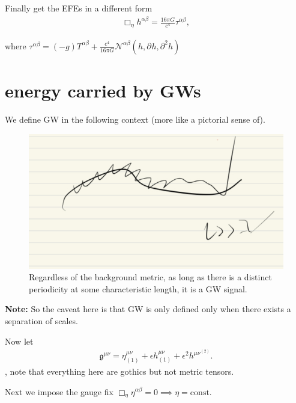 \documentclass[a4paper, 12pt]{article}
\begin{document}
Finally get the EFEs in  a different form 
\begin{align}
  \label{EFE in different form}
  \Box_{\eta} h^{\alpha \beta} = \frac{16 \pi G}{c^4}
  \tau^{\alpha\beta}, 
\end{align}

where \( \tau^{\alpha \beta} = (-g) T^{\alpha \beta} +
\frac{c^4}{16 \pi G} \mathcal{N}^{\alpha \beta} (h,
\partial_{}^{}h, \partial_{}^{2} h )  \)

\section{energy carried by GWs}%
  \label{sec:energy carried by GWs}
 
 We define GW in the following context (more like a pictorial sense of). 
 \begin{figure}[h!]
 \begin{center}
  \includegraphics[scale=0.3]{Figures/gravrep.jpeg}
 \end{center}
 \caption{Regardless of the background metric, as long as there is a
   distinct periodicity at some characteristic length, it is a GW signal.}
 \label{fig:gravrep}
 \end{figure}

\textbf{Note: }So the caveat here is that GW is only defined only when there
exists a separation of scales.

Now let 
\begin{align}
  \label{gothic metric expansion}
  \mathfrak{g}^{\mu \nu} = \eta^{\mu \nu}_{(1)} + \epsilon h^{\mu \nu}_{(1)}
  + \epsilon^{2} h^{\mu \nu}^{(2)}.  
\end{align}, note that everything here are gothics but not metric tensors. 

Next we impose the gauge fix \( \Box_{\eta} \eta^{\alpha \beta} = 0
\implies \eta = \mathrm{const.} \)
\end{document}
